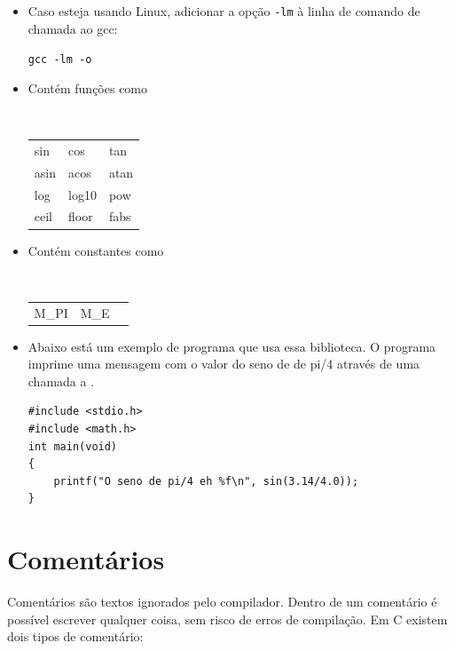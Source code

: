 \begin{itemize}

\item Caso esteja usando Linux, adicionar a opção {\tt -lm} à linha de comando de chamada ao gcc:

{\tt gcc -lm  -o }


\item Contém funções como

{\tt
\begin{tabular}{lll}
sin      & cos      & tan     \\
asin     & acos     & atan    \\
log      & log10    & pow     \\
ceil     & floor    & fabs    \\
\end{tabular}
}

\item Contém constantes como

{\tt
\begin{tabular}{lll}
M\_PI    & M\_E     &         \\
\end{tabular}
}

\item Abaixo está um exemplo de programa que usa essa biblioteca. O programa imprime uma mensagem com o valor do seno de de pi/4 através de uma chamada a \PRINTF.

\begin{lstlisting}
#include <stdio.h>
#include <math.h>
int main(void)
{
    printf("O seno de pi/4 eh %f\n", sin(3.14/4.0));
}
\end{lstlisting}

\end{itemize}


\section{Comentários}

Comentários são textos ignorados pelo compilador. Dentro de um comentário é possível escrever qualquer coisa, sem risco de erros de compilação. Em C existem dois tipos de comentário:

